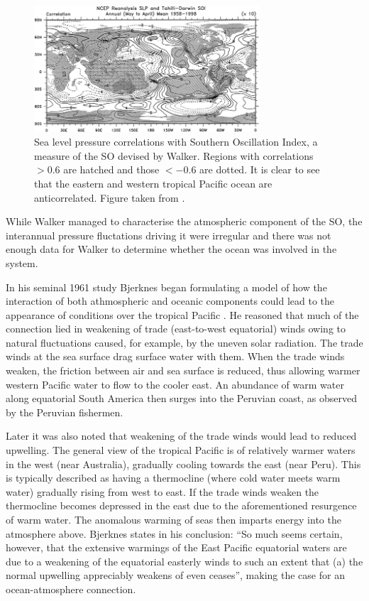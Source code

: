 \begin{figure}
  \centering
  \includegraphics[width=0.75\textwidth]{figures/slp_corr}
  \caption{Sea level pressure correlations with Southern Oscillation Index, a
    measure of the SO devised by Walker. Regions with correlations $>0.6$ are
    hatched and those $<-0.6$ are dotted. It is clear to see that the eastern
    and western tropical Pacific ocean are anticorrelated. Figure taken from
    \cite{trenberth2000}.
  }
  \label{fig:slp_corr}
\end{figure}

While Walker managed to characterise the atmospheric component of the SO, the
interannual pressure fluctations driving it were irregular and there was not
enough data for Walker to determine whether the ocean was involved in the
system.

\vspace{0.5cm}

In his seminal 1961 study Bjerknes began formulating a model of how the
interaction of both athmospheric and oceanic components could lead to the
appearance of \elnino{} conditions over the tropical Pacific
\citep{bjerknes1961}. He reasoned that much of the connection lied in weakening
of trade (east-to-west equatorial) winds owing to natural fluctuations caused,
for example, by the uneven solar radiation. The trade winds at the sea surface
drag surface water with them. When the trade winds weaken, the friction between
air and sea surface is reduced, thus allowing warmer western Pacific water to
flow to the cooler east. An abundance of warm water along equatorial South
America then surges into the Peruvian coast, as observed by the Peruvian
fishermen.

Later \citep{bjerknes1966} it was also noted that weakening of the trade winds
would lead to reduced upwelling. The general view of the tropical Pacific is of
relatively warmer waters in the west (near Australia), gradually cooling towards
the east (near Peru). This is typically described as having a thermocline (where
cold water meets warm water) gradually rising from west to east. If the trade
winds weaken the thermocline becomes depressed in the east due to the
aforementioned resurgence of warm water. The anomalous warming of seas then
imparts energy into the atmosphere above. Bjerknes states in his conclusion:
``So much seems certain, however, that the extensive warmings of the East
Pacific equatorial waters are due to a weakening of the equatorial easterly
winds to such an extent that (a) the normal upwelling appreciably weakens of
even ceases'', making the case for an ocean-atmosphere connection.

